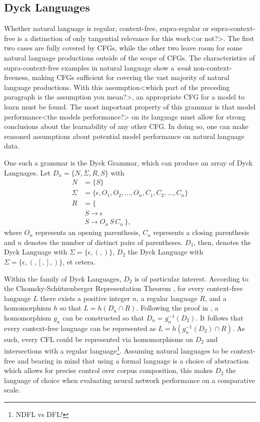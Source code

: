 \subsection{Dyck Languages}\label{dyckLanguages}
Whether natural language is regular, context-free, supra-regular or supra-context-free is a distinction of only tangential relevance for this work<or not?>. The first two cases are fully covered by CFGs, while the other two leave room for some natural language productions outside of the scope of CFGs. The characteristics of supra-context-free examples in natural language show a \textit{weak} non-context-freeness, making CFGs sufficient for covering the vast majority of natural language productions. With this assumption<which part of the preceding paragraph is the assumption you mean?>, an appropriate CFG for a model to learn must be found. The most important property of this grammar is that model performance<the models performance?> on its language must allow for strong conclusions about the learnability of any other CFG. In doing so, one can make reasoned assumptions about potential model performance on natural language data. 

One such a grammar is the Dyck Grammar, which can produce an array of Dyck Languages. Let $D_{n} = \lbrace N, \Sigma, R, S \rbrace$ with
\begin{align*}
	N &= \lbrace S \rbrace \\
	\Sigma &= \lbrace \epsilon, O_{1}, O_{2}, \dots, O_{n}, C_{1}, C_{2}, \dots, C_{n} \rbrace \\
	R &= \lbrace \\
		 & \: S \rightarrow \epsilon \\
		 & \: S \rightarrow O_{n} \, S \, C_{n} \, \rbrace ,
\end{align*}
where $O_{n}$ represents an opening parenthesis, $C_{n}$ represents a closing parenthesis and $n$ denotes the number of distinct pairs of parentheses. $D_1$, then, denotes the Dyck Language with $\Sigma = \lbrace \epsilon, (, ) \rbrace$, $D_2$ the Dyck Language with $\Sigma = \lbrace \epsilon, (, [, ], ) \rbrace$, et cetera.

Within the family of Dyck Languages, $D_2$ is of particular interest. According to the Chomsky-Schützenberger Representation Theorem \citep{Chomsky1963}, for every context-free language $L$ there exists a positive integer $n$, a regular language $R$, and a homomorphism $h$ so that $L = h(D_{n} \cap R)$. Following the proof in \cite{Autebert1997}, a homomorphism $g_{n}$ can be constructed so that $D_{n} = g_{n}^{-1}(D_{2})$. It follows that every context-free language can be represented as $L = h(g_{n}^{-1}(D_{2}) \cap R)$. As such, every CFL could be represented via homomorphisms on $D_2$ and intersections with a regular language\footnote{NDFL vs DFL!}. Assuming natural languages to be context-free and bearing in mind that using a formal language is a choice of abstraction which allows for precise control over corpus composition, this makes $D_2$ the language of choice when evaluating neural network performance on a comparative scale.

